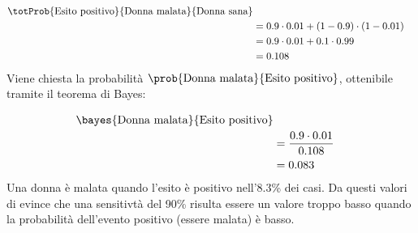 \documentclass[\main/main.tex]{subfiles}
\begin{document}
\formulaProbTot

\begin{align*}
  \totProb{\text{Esito positivo}}{\text{Donna malata}}{\text{Donna sana}} \\
   & = 0.9\cdot0.01 + (1-0.9)\cdot(1-0.01)                                \\
   & = 0.9\cdot0.01 + 0.1\cdot0.99                                        \\
   & = 0.108
\end{align*}
Viene chiesta la probabilità $\prob{\text{Donna malata}}{\text{Esito positivo}}$, ottenibile tramite il teorema di Bayes:

\bayesTh

\begin{align*}
  \bayes{\text{Donna malata}}{\text{Esito positivo}} \\
   & = \frac{0.9\cdot0.01}{0.108}                    \\
   & = 0.083
\end{align*}
Una donna è malata quando l'esito è positivo nell'8.3\% dei casi. Da questi valori di evince che una sensitivtà del 90\% risulta essere un valore troppo basso quando la probabilità dell'evento positivo (essere malata) è basso.
\end{document}
